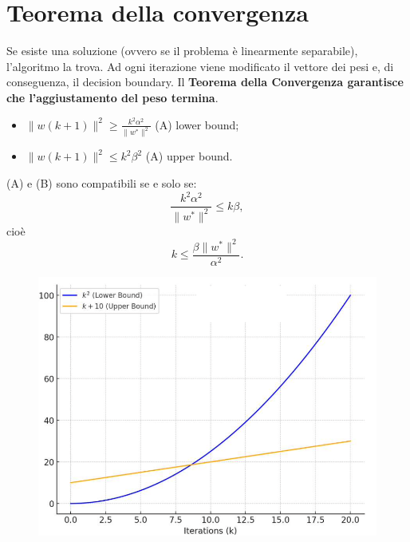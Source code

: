 \section{Teorema della convergenza}
Se esiste una soluzione (ovvero se il problema è linearmente separabile), l'algoritmo la trova. \newline
Ad ogni iterazione viene modificato il vettore dei pesi e, di conseguenza, il decision boundary. Il \textbf{Teorema della Convergenza garantisce che l’aggiustamento del peso termina}.
\begin{itemize}
    \item $\|w(k+1)\|^2\geq \frac{k^2\alpha^2}{\|w^*\|^2}$ (A) lower bound;
    \item $\|w(k+1)\|^2\leq k^2\beta^2$ (A) upper bound.
\end{itemize}
(A) e (B) sono compatibili se e solo se:
\begin{equation}
    \frac{k^2\alpha^2}{\|w^*\|^2}\leq k\beta,
\end{equation}
cioè
\begin{equation}
    k\leq \frac{\beta\|w^*\|^2}{\alpha^2}.
\end{equation}
\begin{figure}[!h]
    \includegraphics[scale=.8]{images/perceptron/convTheorem.png}
    \centering
\end{figure}
\newpage
